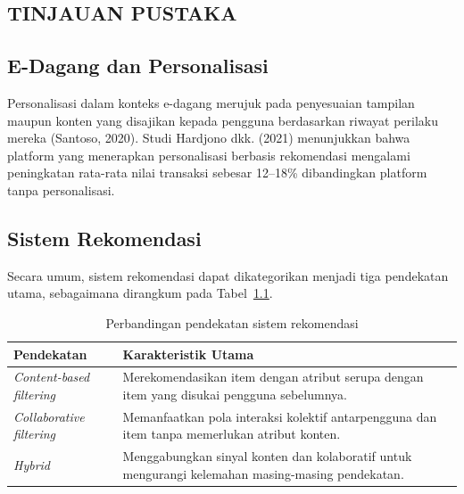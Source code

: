 \documentclass[12pt,a4paper]{report}
\begin{document}
\begin{onehalfspace}
\chapter{TINJAUAN PUSTAKA}

\section{E-Dagang dan Personalisasi}
Personalisasi dalam konteks e-dagang merujuk pada penyesuaian tampilan
maupun konten yang disajikan kepada pengguna berdasarkan riwayat perilaku
mereka (Santoso, 2020). Studi Hardjono dkk. (2021) menunjukkan bahwa
platform yang menerapkan personalisasi berbasis rekomendasi mengalami
peningkatan rata-rata nilai transaksi sebesar 12--18\% dibandingkan
platform tanpa personalisasi.

\section{Sistem Rekomendasi}
Secara umum, sistem rekomendasi dapat dikategorikan menjadi tiga pendekatan
utama, sebagaimana dirangkum pada Tabel~\ref{tab:pendekatan}.

\begin{table}[htb]
\centering
\caption{Perbandingan pendekatan sistem rekomendasi}
\label{tab:pendekatan}
\begin{tabularx}{\textwidth}{@{}p{3.2cm}X@{}}
\toprule
\textbf{Pendekatan} & \textbf{Karakteristik Utama} \\
\midrule
\emph{Content-based filtering} & Merekomendasikan item dengan atribut
  serupa dengan item yang disukai pengguna sebelumnya. \\
\emph{Collaborative filtering} & Memanfaatkan pola interaksi kolektif
  antarpengguna dan item tanpa memerlukan atribut konten. \\
\emph{Hybrid} & Menggabungkan sinyal konten dan kolaboratif untuk
  mengurangi kelemahan masing-masing pendekatan. \\
\bottomrule
\end{tabularx}
\end{table}


\end{onehalfspace}
\end{document}
